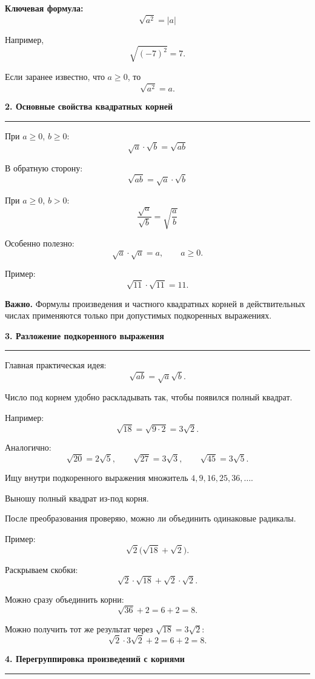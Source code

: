 \documentclass[a4paper,12pt]{article}
\newcommand{\topic}[1]{%
    \vspace{0.7em}
    {\large\bfseries\color{darkaccent}#1}\par
    \vspace{0.25em}
    {\color{rulegray}\hrule}
    \vspace{0.65em}
}
\newcommand{\important}[1]{{\bfseries\color{darkaccent}#1}}
\begin{document}
\important{Ключевая формула:}
\[
\boxed{\sqrt{a^2}=|a|}
\]

Например,
\[
\sqrt{(-7)^2}=7.
\]

Если заранее известно, что \(a\ge0\), то
\[
\sqrt{a^2}=a.
\]

\topic{2. Основные свойства квадратных корней}

При \(a\ge0\), \(b\ge0\):
\[
\boxed{\sqrt a\cdot\sqrt b=\sqrt{ab}}
\]

В обратную сторону:
\[
\boxed{\sqrt{ab}=\sqrt a\cdot\sqrt b}
\]

При \(a\ge0\), \(b>0\):
\[
\boxed{\frac{\sqrt a}{\sqrt b}=\sqrt{\frac ab}}
\]

Особенно полезно:
\[
\boxed{\sqrt a\cdot\sqrt a=a},
\qquad a\ge0.
\]

Пример:
\[
\sqrt{11}\cdot\sqrt{11}=11.
\]

\important{Важно.}
Формулы произведения и частного квадратных корней в действительных числах применяются только при допустимых подкоренных выражениях.

\topic{3. Разложение подкоренного выражения}

Главная практическая идея:
\[
\sqrt{ab}=\sqrt a\sqrt b.
\]

Число под корнем удобно раскладывать так, чтобы появился полный квадрат.

Например:
\[
\sqrt{18}=\sqrt{9\cdot2}=3\sqrt2.
\]

Аналогично:
\[
\sqrt{20}=2\sqrt5,
\qquad
\sqrt{27}=3\sqrt3,
\qquad
\sqrt{45}=3\sqrt5.
\]

\begin{checklist}
    \item Ищу внутри подкоренного выражения множитель \(4,9,16,25,36,\ldots\).
    \item Выношу полный квадрат из-под корня.
    \item После преобразования проверяю, можно ли объединить одинаковые радикалы.
\end{checklist}

Пример:
\[
\sqrt2\bigl(\sqrt{18}+\sqrt2\bigr).
\]

Раскрываем скобки:
\[
\sqrt2\cdot\sqrt{18}+\sqrt2\cdot\sqrt2.
\]

Можно сразу объединить корни:
\[
\sqrt{36}+2=6+2=8.
\]

Можно получить тот же результат через \(\sqrt{18}=3\sqrt2\):
\[
\sqrt2\cdot3\sqrt2+2=6+2=8.
\]

\topic{4. Перегруппировка произведений с корнями}
\end{document}

